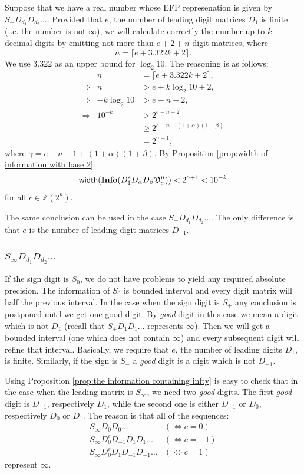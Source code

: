 \documentclass[11pt,a4paper]{article}
\begin{document}
Suppose that we have a real number whose EFP represenation is given by
	$S_+ D_{d_1} D_{d_2} \ldots$. Provided that $e$, the number of leading
	digit matrices $D_1$ is finite (i.e. the number is not $\infty$), we
	will calculate correctly the number up to $k$ decimal digits by
	emitting not more than $e+2+n$ digit matrices, where
	\begin{equation}
		n = \lceil e + 3.322 k + 2 \rceil.
	\end{equation}
	We use $3.322$ as an upper bound for $\log_2 10$. The reasoning is
	as follows:
	\[ \begin{array}{lrl}
		& n & = \lceil e + 3.322 k + 2 \rceil, \\
		\Rightarrow & n & > e + k \log_2 10 + 2, \\
		\Rightarrow & -k \log_2 10 & > e - n + 2, \\
		\Rightarrow & 10^{-k} & > 2^{e-n+2} \\
		&& \ge 2^{e-n+(1+\alpha)(1+\beta)} \\
		&& = 2^{\gamma + 1},
	\end{array} \]
	where $\gamma = e-n-1+(1+\alpha)(1+\beta)$. By Proposition
	\ref{prop:width of information with base 2}:
	\[ {\sf width} ( {\bf Info} (D_1^e D_\alpha D_\beta
		\mathfrak{D}_c^n )) < 2^{\gamma+1} < 10^{-k} \]
	for all $c \in \mathbb{Z}(2^n)$.

The same conclusion can be used in the case $S_- D_{d_1} D_{d_2} \ldots$.
	The only difference is that $e$ is the number of leading digit matrices
	$D_{-1}$.


\subsubsection{$S_\infty D_{d_1} D_{d_2} \ldots$}
If the sign digit is $S_0$, we do not have problems to yield any required
	absolute precision. The information of $S_0$ is bounded interval and
	every digit matrix will half the previous interval. In the case when
	the sign digit is $S_+$ any conclusion is postponed until we get one
	{\sc good} digit. By {\em good} digit in this case we mean a digit which
	is not $D_1$ (recall that $S_+ D_1 D_1 \ldots$ represents $\infty$).
	Then we will get a bounded interval (one which does not contain
	$\infty$) and every subsequent digit will refine that interval.
	Basically, we require that $e$, the number of leading digits $D_1$, is
	finite. Similarly, if the sign is $S_-$ a {\em good} digit is a digit
	which is not $D_{-1}$.

Using Proposition \ref{prop:the information containing infty} is easy to
	check that in the case when the leading matrix is $S_\infty$, we need two
	{\em good} digits. The first {\em good} digit is $D_{-1}$, respectively
	$D_1$, while the second one is either $D_{-1}$ or $D_0$, respectively
	$D_0$ or $D_1$. The reason is that all of the sequences:
	\[ \begin{array}{ll}
		S_\infty D_0 D_0 \ldots &(\Leftrightarrow c=0) \\
		S_\infty D_0^e D_{-1} D_1 D_1 \ldots &(\Leftrightarrow c=-1) \\
		S_\infty D_0^e D_1 D_{-1} D_{-1} \ldots &(\Leftrightarrow c=1)
	\end{array} \]
	represent $\infty$.
\end{document}
